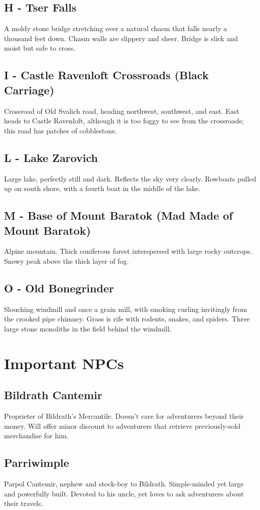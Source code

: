 \documentclass[a4paper,11pt]{article}
\begin{document}
\subsection{H - Tser Falls}
  A moldy stone bridge stretching over a natural chasm that falls nearly a thousand feet down. Chasm walls are 
  slippery and sheer. Bridge is slick and moist but safe to cross.
\subsection{I - Castle Ravenloft Crossroads (Black Carriage)}
  Crossroad of Old Svalich road, heading northwest, southwest, and east. East heads to Castle Ravenloft, 
  although it is too foggy to see from the crossroads; this road has patches of cobblestone.
\subsection{L - Lake Zarovich}
  Large lake, perfectly still and dark. Reflects the sky very clearly. Rowboats pulled up on south shore, with a
  fourth boat in the middle of the lake.
\subsection{M - Base of Mount Baratok (Mad Made of Mount Baratok)}
  Alpine mountain. Thick coniferous forest interspersed with large rocky outcrops. Snowy peak above the thick
  layer of fog.
\subsection{O - Old Bonegrinder}
  Slouching windmill and once a grain mill, with smoking curling invitingly from the crooked pipe chimney. Grass
  is rife with rodents, snakes, and spiders. Three large stone monoliths in the field behind the windmill.


\section{Important NPCs}
\label{sec:ImportantNPCs}
\subsection{Bildrath Cantemir}
  Proprieter of Bildrath's Mercantile. Doesn't care for adventurers beyond their money. Will offer minor discount
  to adventurers that retrieve previously-sold merchandise for him.
\subsection{Parriwimple}
  Parpol Cantemir, nephew and stock-boy to Bildrath. Simple-minded yet large and powerfully built. Devoted to 
  his uncle, yet loves to ask adventurers about their travels.
\end{document}
